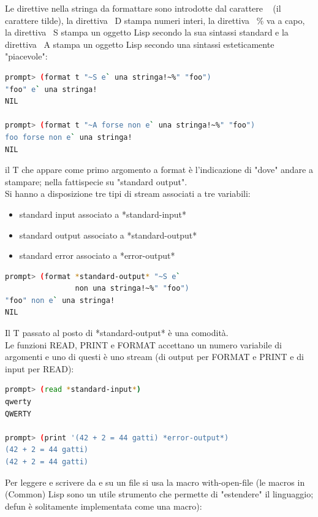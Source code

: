 \documentclass[a4paper,12pt, oneside]{book}
\begin{document}
Le direttive nella stringa da formattare sono introdotte
dal carattere ~ (il carattere tilde), la direttiva ~D stampa numeri interi, la direttiva ~\% va a capo, la direttiva ~S stampa un oggetto Lisp secondo la sua sintassi
standard e la direttiva ~A stampa un oggetto Lisp secondo una sintassi esteticamente "piacevole":
\begin{shaded}
	\begin{lstlisting}[language=bash]
prompt> (format t "~S e` una stringa!~%" "foo")
"foo" e` una stringa!
NIL

prompt> (format t "~A forse non e` una stringa!~%" "foo")
foo forse non e` una stringa!
NIL
\end{lstlisting}
\end{shaded}
il T che appare come primo argomento a format è l'indicazione di "dove" andare a stampare; nella fattispecie su
"standard output".\\
Si hanno a disposizione tre tipi di stream associati a tre variabili:
\begin{itemize}
	\item standard input associato a *standard-input*
	\item standard output associato a *standard-output*
	\item standard error associato a *error-output*
\end{itemize}
\begin{shaded}
	\begin{lstlisting}[language=bash]
prompt> (format *standard-output* "~S e` 
                non una stringa!~%" "foo")
"foo" non e` una stringa!
NIL
\end{lstlisting}
\end{shaded}
Il T passato al posto di *standard-output* è una comodità.\\
Le funzioni READ, PRINT e FORMAT accettano un numero variabile di argomenti e uno di questi è uno stream (di output per FORMAT e PRINT e di input per
READ):
\begin{shaded}
	\begin{lstlisting}[language=bash]
prompt> (read *standard-input*)
qwerty
QWERTY

prompt> (print '(42 + 2 = 44 gatti) *error-output*)
(42 + 2 = 44 gatti)
(42 + 2 = 44 gatti)
\end{lstlisting}
\end{shaded}
Per leggere e scrivere da e su un file si usa
la macro with-open-file (le macros in (Common) Lisp sono un utile strumento che permette di "estendere" il
linguaggio; defun è solitamente implementata come una macro):
\end{document}

